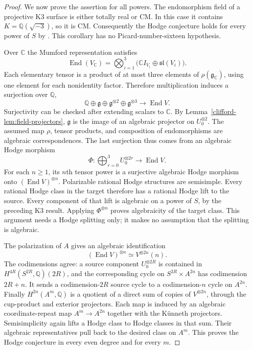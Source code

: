 \documentclass[11pt]{article}
\theoremstyle{definition}
\theoremstyle{remark}
\begin{document}
\begin{proof}
We now prove the assertion for all powers.  The endomorphism field of a
projective K3 surface is either totally real or CM.  In this case it
contains $K=\mathbb Q(\sqrt{-3})$, so it is CM.  Consequently the Hodge
conjecture holds for every power of $S$ by
\cite[\S2 and Corollary~2.3, pp.~6--7]{clifford-Varesco}.
This corollary has no Picard-number-sixteen hypothesis.

Over $\mathbb C$ the Mumford representation satisfies
\[
 \operatorname{End}(V_{\mathbb C})
   =\bigotimes_{i=1}^3
       \bigl(\mathbb C I_{V_i}\oplus\mathfrak{sl}(V_i)\bigr).
\]
Each elementary tensor is a product of at most three elements of
$\rho(\mathfrak g_{\mathbb C})$, using one element for each nonidentity
factor.  Therefore multiplication induces a surjection over $\mathbb Q$,
\[
 \mathbb Q\oplus\mathfrak g\oplus\mathfrak g^{\otimes2}
                  \oplus\mathfrak g^{\otimes3}
       \longrightarrow\operatorname{End}V.
\]
Surjectivity can be checked after extending scalars to $\mathbb C$.
By Lemma~\ref{clifford-lem:field-projectors}, $\mathfrak g$ is the image
of an algebraic projector on $U_0^{\otimes2}$.  The assumed map $\rho$,
tensor products, and composition of endomorphisms are algebraic
correspondences.  The last surjection thus comes from an algebraic
Hodge morphism
\[
 \Phi:\bigoplus_{r=0}^{3}U_0^{\otimes2r}
           \longrightarrow\operatorname{End}V.
\]
For each $n\ge1$, its $n$th tensor power is a surjective algebraic
Hodge morphism onto $(\operatorname{End}V)^{\otimes n}$.
Polarizable rational Hodge structures are semisimple.  Every rational
Hodge class in the target therefore has a rational Hodge lift to the
source.  Every component of that lift is algebraic on a power of $S$,
by the preceding K3 result.  Applying $\Phi^{\otimes n}$ proves
algebraicity of the target class.  This argument needs a Hodge splitting
only; it makes no assumption that the splitting is algebraic.

The polarization of $A$ gives an algebraic identification
\[
 (\operatorname{End}V)^{\otimes n}\simeq V^{\otimes2n}(n).
\]
The codimensions agree: a source component $U_0^{\otimes2R}$ is
contained in $H^{4R}(S^{2R},\mathbb Q)(2R)$, and the corresponding
cycle on $S^{2R}\times A^{2n}$ has codimension $2R+n$.  It sends a
codimension-$2R$ source cycle to a codimension-$n$ cycle on $A^{2n}$.
Finally $H^{2n}(A^m,\mathbb Q)$ is a quotient of a direct sum of
copies of $V^{\otimes2n}$, through the cup-product and exterior
projectors.  Each map is induced by an algebraic coordinate-repeat
map $A^m\to A^{2n}$ together with the K\"unneth projectors.
Semisimplicity again lifts a Hodge class to Hodge classes in that
sum.  Their algebraic representatives pull back to the desired
class on $A^m$.  This proves the Hodge conjecture in every even
degree and for every $m$.
\end{proof}
\end{document}
